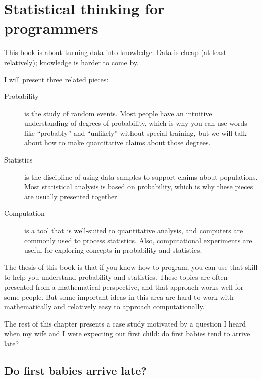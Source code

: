 \documentclass[12pt]{book}
\begin{document}
\mainmatter


\chapter{Statistical thinking for programmers}
\label{intro}

This book is about turning data into knowledge.  Data is cheap (at
least relatively); knowledge is harder to come by.

I will present three related pieces:

\begin{description}

\item[Probability] is the study of random events.  Most people have an
  intuitive understanding of degrees of probability, which is why you
  can use words like ``probably'' and ``unlikely'' without special
  training, but we will talk about how to make quantitative claims
  about those degrees.

\item[Statistics] is the discipline of using data samples to support
  claims about populations.  Most statistical analysis is based on
  probability, which is why these pieces are usually presented
  together.

\item[Computation] is a tool that is well-suited to quantitative
  analysis, and computers are commonly used to process statistics.
  Also, computational experiments
  are useful for exploring concepts in probability and statistics.

\end{description}

The thesis of this book is that if you know how to program, you can
use that skill to help you understand probability and statistics.
These topics are often presented from a mathematical perspective, and
that approach works well for some people.  But some important ideas
in this area are hard to work with mathematically and relatively
easy to approach computationally.

The rest of this chapter presents a case study motivated by a question
I heard when my wife and I were expecting our first child: do first
babies tend to arrive late?

\section{Do first babies arrive late?}
\end{document}
